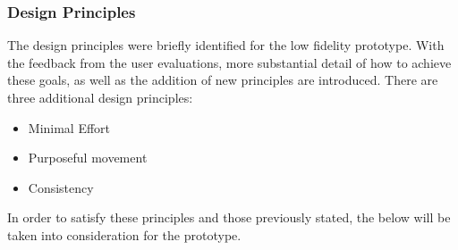\documentclass[a4 paper, 12pt]{article}
\begin{document}
    \subsubsection*{Design Principles}
    The design principles were briefly identified for the low fidelity prototype. With the feedback from the user evaluations, more substantial detail of how to achieve these goals, as well as the addition of new principles are introduced. There are three additional design principles:
        \begin{multicols}{3}
            \begin{itemize}
                \item Minimal Effort
                \item Purposeful movement
                \item Consistency
            \end{itemize}
        \end{multicols}
    In order to satisfy these principles and those previously stated, the below will be taken into consideration for the prototype.
\end{document}
